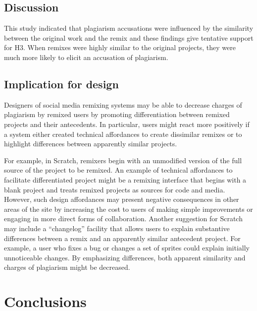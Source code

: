 \subsection{Discussion}

This study indicated that plagiarism accusations were influenced by the
similarity between the original work and the remix and these findings
give tentative support for H3. When remixes were highly similar to the
original projects, they were much more likely to elicit an accusation of
plagiarism.

\subsection{Implication for design}

Designers of social media remixing systems may be able to decrease
charges of plagiarism by remixed users by promoting differentiation
between remixed projects and their antecedents. In particular, users
might react more positively if a system either created technical
affordances to create dissimilar remixes or to highlight differences
between apparently similar projects.

For example, in Scratch, remixers begin with an unmodified version of
the full source of the project to be remixed. An example of technical
affordances to facilitate differentiated project might be a remixing
interface that begins with a blank project and treats remixed projects as
sources for code and media. However, such design affordances may present
negative consequences in other areas of the site by increasing the cost
to users of making simple improvements or engaging in more direct forms
of collaboration. Another suggestion for Scratch may
include a ``changelog'' facility that allows users to explain
substantive differences between a remix and an apparently similar
antecedent project. For example, a user who fixes a bug or changes a set
of sprites could explain initially unnoticeable changes. By emphasizing
differences, both apparent similarity and charges of plagiarism might be
decreased.

\section{Conclusions}

